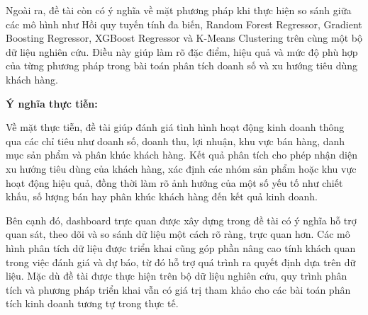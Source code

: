 Ngoài ra, đề tài còn có ý nghĩa về mặt phương pháp khi thực hiện so sánh giữa các mô hình như Hồi quy tuyến tính đa biến, Random Forest Regressor, Gradient Boosting Regressor, XGBoost Regressor và K-Means Clustering trên cùng một bộ dữ liệu nghiên cứu. Điều này giúp làm rõ đặc điểm, hiệu quả và mức độ phù hợp của từng phương pháp trong bài toán phân tích doanh số và xu hướng tiêu dùng khách hàng.

\textbf{Ý nghĩa thực tiễn:}

Về mặt thực tiễn, đề tài giúp đánh giá tình hình hoạt động kinh doanh thông qua các chỉ tiêu như doanh số, doanh thu, lợi nhuận, khu vực bán hàng, danh mục sản phẩm và phân khúc khách hàng. Kết quả phân tích cho phép nhận diện xu hướng tiêu dùng của khách hàng, xác định các nhóm sản phẩm hoặc khu vực hoạt động hiệu quả, đồng thời làm rõ ảnh hưởng của một số yếu tố như chiết khấu, số lượng bán hay phân khúc khách hàng đến kết quả kinh doanh.

Bên cạnh đó, dashboard trực quan được xây dựng trong đề tài có ý nghĩa hỗ trợ quan sát, theo dõi và so sánh dữ liệu một cách rõ ràng, trực quan hơn. Các mô hình phân tích dữ liệu được triển khai cũng góp phần nâng cao tính khách quan trong việc đánh giá và dự báo, từ đó hỗ trợ quá trình ra quyết định dựa trên dữ liệu. Mặc dù đề tài được thực hiện trên bộ dữ liệu nghiên cứu, quy trình phân tích và phương pháp triển khai vẫn có giá trị tham khảo cho các bài toán phân tích kinh doanh tương tự trong thực tế.